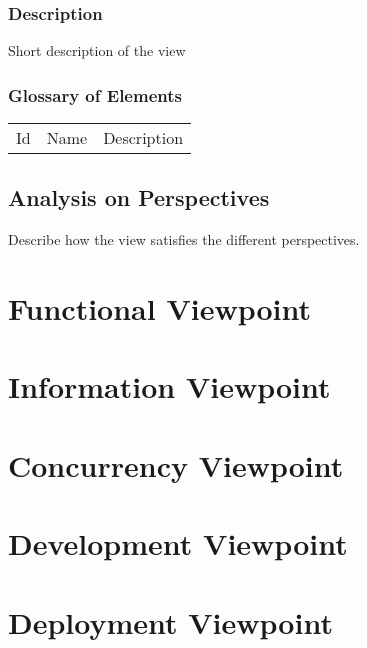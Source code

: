 \documentclass{article}
\begin{document}
\subsubsection*{Description}
Short description of the view

\subsubsection*{Glossary of Elements}
\begin{longtable}{lll}
Id & Name & Description \\
\end{longtable}

\subsection*{Analysis on Perspectives}
Describe how the view satisfies the different perspectives. 

\section*{Functional Viewpoint}

\section*{Information Viewpoint}

\section*{Concurrency Viewpoint}

\section*{Development Viewpoint}

\section*{Deployment Viewpoint}
\end{document}
